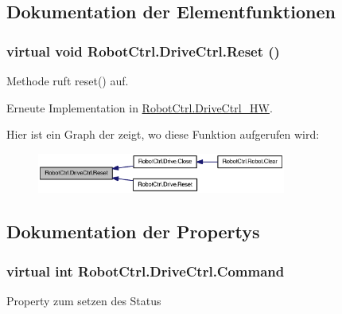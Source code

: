 \subsection{Dokumentation der Elementfunktionen}
\hypertarget{class_robot_ctrl_1_1_drive_ctrl_a721795047bfe5d2cca3fab6eeb0ab905}{
\subsubsection[{Reset}]{\setlength{\rightskip}{0pt plus 5cm}virtual void RobotCtrl.DriveCtrl.Reset ()}}
\label{class_robot_ctrl_1_1_drive_ctrl_a721795047bfe5d2cca3fab6eeb0ab905}
Methode ruft reset() auf. 

Erneute Implementation in \hyperlink{class_robot_ctrl_1_1_drive_ctrl___h_w_a30785a704b5385ea9c41ad87ebb8f61f}{RobotCtrl.DriveCtrl\_\-HW}.



Hier ist ein Graph der zeigt, wo diese Funktion aufgerufen wird:\nopagebreak
\begin{figure}[H]
\begin{center}
\leavevmode
\includegraphics[width=232pt]{class_robot_ctrl_1_1_drive_ctrl_a721795047bfe5d2cca3fab6eeb0ab905_icgraph}
\end{center}
\end{figure}




\subsection{Dokumentation der Propertys}
\hypertarget{class_robot_ctrl_1_1_drive_ctrl_a45359565bdcb6293ed723acb48cae18b}{
\subsubsection[{Command}]{\setlength{\rightskip}{0pt plus 5cm}virtual int RobotCtrl.DriveCtrl.Command}}
\label{class_robot_ctrl_1_1_drive_ctrl_a45359565bdcb6293ed723acb48cae18b}
Property zum setzen des Status 

